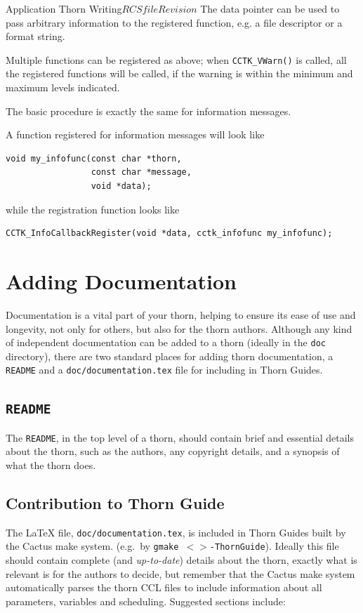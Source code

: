 \begin{cactuspart}{Application Thorn Writing}{$RCSfile$}{$Revision$}
The data pointer can be used to pass arbitrary information to the
registered function, e.g. a file descriptor or a format string.

Multiple functions can be registered as above; when
\texttt{CCTK\_VWarn()} is called, all the registered functions will be
called, if the warning is within the minimum and maximum levels
indicated.

The basic procedure is exactly the same for information messages.

A function registered for information messages will look like
\begin{verbatim}
void my_infofunc(const char *thorn,
                 const char *message,
                 void *data);
\end{verbatim}
while the registration function looks like 
\begin{verbatim}
CCTK_InfoCallbackRegister(void *data, cctk_infofunc my_infofunc);
\end{verbatim}


\section{Adding Documentation}
\label{sec:Adding_documentation}

Documentation is a vital part of your thorn, helping to ensure its
ease of use and longevity, not only for others, but also for the thorn
authors.  Although any kind of independent documentation can be added
to a thorn (ideally in the \texttt{doc} directory), there are two
standard places for adding thorn documentation, a \texttt{README} and a
\texttt{doc/documentation.tex} file for including in Thorn Guides.

\subsection{\texttt{README}}

The \texttt{README}, in the top level of a thorn, should contain brief
and essential details about the thorn, such as the authors, any
copyright details, and a synopsis of what the thorn does.

\subsection{Contribution to Thorn Guide}

The LaTeX file, \texttt{doc/documentation.tex}, is included in Thorn Guides
built by the Cactus make system. (e.g.\ by \texttt{gmake
$<$$>$-ThornGuide}). Ideally this file should contain complete
(and \textit{up-to-date}) details about the thorn, exactly what is
relevant is for the authors to decide, but remember that the Cactus
make system automatically parses the thorn CCL files to include
information about all parameters, variables and scheduling. Suggested
sections include:


\end{cactuspart}
